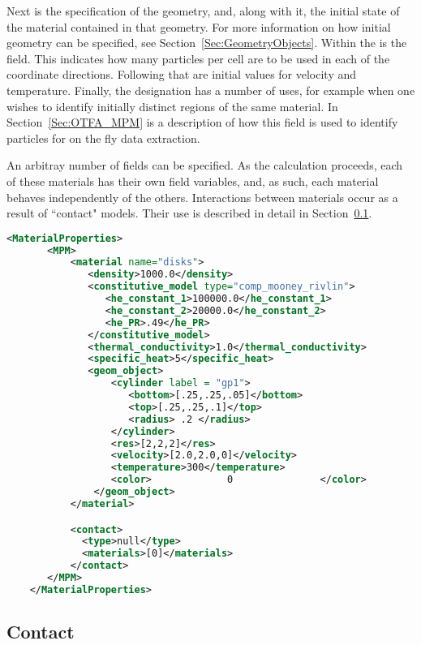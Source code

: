 Next is the specification of the geometry, and, along with it, the initial
state of the material contained in that geometry.  For more information on
how initial geometry can be specified, see Section~\ref{Sec:GeometryObjects}.  Within the
 is the  field.  This
indicates how many particles per cell are to be used in each of the 
coordinate directions.  Following that are initial values for velocity and
temperature.  Finally, the  designation has a number
of uses, for example when one wishes to identify initially distinct regions
of the same material.  In Section~\ref{Sec:OTFA_MPM} is a description of how
this field is used to identify particles for on the fly data extraction.

An arbitray number of  fields can be specified.
As the calculation proceeds, each of these materials has their own field
variables, and, as such, each material behaves independently of the others.
Interactions between materials occur as a result of ``contact" models.
Their use is described in detail in Section~\ref{Sec:Contact}.

\begin{lstlisting}[language=XML]
    <MaterialProperties>
       <MPM>
           <material name="disks">
              <density>1000.0</density>
              <constitutive_model type="comp_mooney_rivlin">
                 <he_constant_1>100000.0</he_constant_1>
                 <he_constant_2>20000.0</he_constant_2>
                 <he_PR>.49</he_PR>
              </constitutive_model>
              <thermal_conductivity>1.0</thermal_conductivity>
              <specific_heat>5</specific_heat>
              <geom_object>
                  <cylinder label = "gp1">
                     <bottom>[.25,.25,.05]</bottom>
                     <top>[.25,.25,.1]</top>
                     <radius> .2 </radius>
                  </cylinder>
                  <res>[2,2,2]</res>
                  <velocity>[2.0,2.0,0]</velocity>
                  <temperature>300</temperature>
                  <color>             0               </color>
               </geom_object>
           </material>

           <contact>
             <type>null</type>
             <materials>[0]</materials>
           </contact>
       </MPM>
    </MaterialProperties>
\end{lstlisting}

\subsection{Contact}  \label{Sec:Contact}

